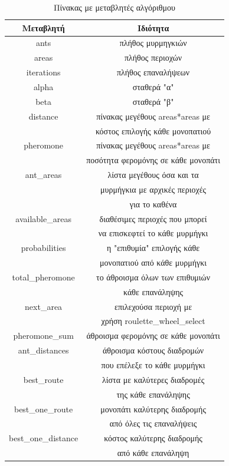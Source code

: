 \begin{table}
\begin{center}
\begin{tabular}{|c|c|}
    \hline
    {\bf Μεταβλητή} & {\bf Ιδιότητα}\\ \hline
    ants & πλήθος μυρμηγκιών\\ \hline
    areas & πλήθος περιοχών\\ \hline
    iterations & πλήθος επαναλήψεων\\ \hline
    alpha & σταθερά "α"\\ \hline
    beta & σταθερά "β" \\ \hline
    distance & πίνακας μεγέθους areas*areas με\\
    &  κόστος επιλογής κάθε μονοπατιού\\ \hline
    pheromone & πίνακας μεγέθους areas*areas με\\ 
    & ποσότητα φερομόνης σε κάθε μονοπάτι\\ \hline
    ant\_areas & λίστα μεγέθους όσα και τα\\ 
    & μυρμήγκια με αρχικές περιοχές\\
    & για το καθένα\\ \hline
    available\_areas & διαθέσιμες περιοχές που μπορεί\\ 
    & να επισκεφτεί το κάθε μυρμήγκι\\ \hline
    probabilities & η "επιθυμία" επιλογής κάθε\\
    & μονοπατιού από κάθε μυρμήγκι\\ \hline
    total\_pheromone & το άθροισμα όλων των επιθυμιών\\ 
    & κάθε επανάληψης\\ \hline
    next\_area & επιλεχούσα περιοχή με\\ 
    & χρήση roulette\_wheel\_select\\ \hline
    pheromone\_sum & άθροισμα φερομόνης σε κάθε μονοπάτι\\ \hline
    ant\_distances & άθροισμα κόστους διαδρομών\\ 
    & που επέλεξε το κάθε μυρμήγκι\\ \hline
    best\_route & λίστα με καλύτερες διαδρομές\\
    & της κάθε επανάληψης\\ \hline
    best\_one\_route & μονοπάτι καλύτερης διαδρομής\\
    & από όλες τις επαναλήψεις\\ \hline
    best\_one\_distance & κόστος καλύτερης διαδρομής\\
    & από κάθε επανάληψη\\ \hline

\end{tabular}
\end{center}
\caption{Πίνακας με μεταβλητές αλγόριθμου}
\end{table}





